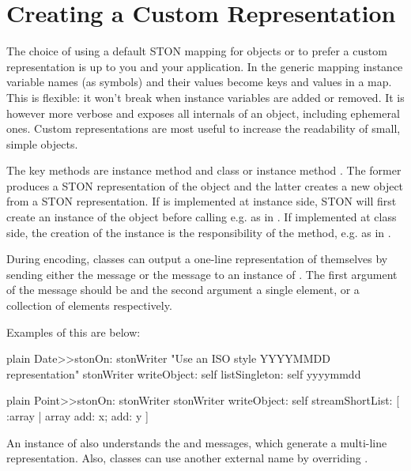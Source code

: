 \documentclass[10pt,twoside,english]{_support/latex/sbabook/sbabook}
\begin{document}
\section{Creating a Custom Representation}
The choice of using a default STON mapping for objects or to prefer a custom representation is up to you and your application. In the generic mapping instance
variable names (as symbols) and their values become keys and values in a map. This is flexible: it won't break when instance variables are added or removed.
It is however more verbose and exposes all internals of an object, including ephemeral ones. Custom representations are most useful to increase the readability
of small, simple objects.

The key methods are instance method  and class or instance method .
The former produces a STON representation of the object and the latter creates a new object from a STON representation. If  is implemented at
instance side, STON will first create an instance of the object before calling  e.g. as in . If implemented at class side, the creation of
the instance is the responsibility of the   method, e.g. as in .

During encoding, classes can output a one-line representation of themselves by sending either the message  or
the message  to an instance of . The first argument of the message should be  and the second argument a single element, or a
collection of elements respectively.

Examples of this are below:

\begin{displaycode}{plain}
Date>>stonOn: stonWriter
   "Use an ISO style YYYYMMDD representation"
   stonWriter writeObject: self listSingleton: self yyyymmdd
\end{displaycode}

\begin{displaycode}{plain}
Point>>stonOn: stonWriter
   stonWriter writeObject: self streamShortList: [ :array |
      array add: x; add: y ]
\end{displaycode}

An instance of  also understands the  and  messages, which generate a multi-line representation. Also, classes can use another external name by overriding .
\end{document}
